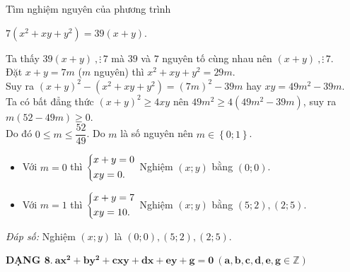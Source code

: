 \begin{vd}
    Tìm nghiệm nguyên của phương trình 
    \begin{center}
    $7\left(x^2+xy+y^2\right)=39\left(x+y\right)$.
    \end{center}
    \loigiai
    {
        Ta thấy $39(x+y)\ , \vdots\, 7$ mà $39$ và $7$ nguyên tố cùng nhau nên $(x+y)\ , \vdots\, 7$.\\
        Đặt $x+y=7m$ ($m$ nguyên) thì $x^2+xy+y^2=29m$.\\
        Suy ra $(x+y)^2-\left(x^2+xy +y^2\right)=\left(7m\right)^2-39m$ hay $xy=49m^2-39m$.\\
        Ta có bất đẳng thức $(x+y)^2\ge 4xy$ nên $49m^2\ge 4\left(49m^2-39m\right)$, suy ra $m\left(52-49m\right)\ge 0$.\\
        Do đó $0\le m\le \dfrac{52}{49}$. Do $m$ là số nguyên nên $m\in\left\{0;1\right\}$.
        \begin{itemize}
        \item Với $m=0$ thì $\left\{\begin{aligned}&x+y=0\\&xy=0.\end{aligned}\right.$ Nghiệm $(x;y)$ bằng $(0;0)$.
         \item Với $m=1$ thì $\left\{\begin{aligned}&x+y=7\\&xy=10.\end{aligned}\right.$ Nghiệm $(x;y)$ bằng $(5;2),(2;5)$.
\end{itemize}
\textit{Đáp số: }Nghiệm $(x;y)$ là $(0;0),(5;2),(2;5)$.          
    }
\end{vd}
\textbf{DẠNG $\mathbf{8.\ ax^2+by^2+cxy+dx+ey+g=0\ \left(a,b,c,d,e,g\in\mathbb{Z}\right)}$}
